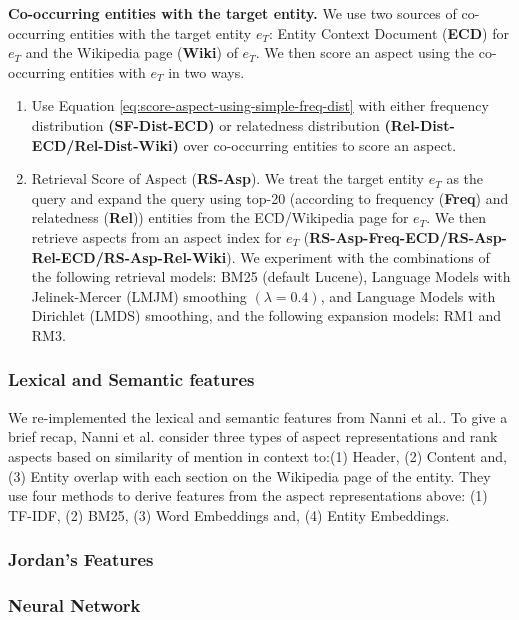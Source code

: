\textbf{Co-occurring entities with the target entity.} 
We use two sources of co-occurring entities with the target entity $e_T$: Entity Context Document (\textbf{ECD}) for $e_T$ and the Wikipedia page (\textbf{Wiki}) of $e_T$. We then score an aspect using the co-occurring entities with $e_T$ in two ways.

    
\begin{enumerate}
    \item Use Equation \ref{eq:score-aspect-using-simple-freq-dist} with either frequency distribution \textbf{(SF-Dist-ECD)} or relatedness distribution \textbf{(Rel-Dist-ECD/Rel-Dist-Wiki)} over co-occurring entities to score an aspect.
        
    \item Retrieval Score of Aspect (\textbf{RS-Asp}). We treat the target entity $e_T$ as the query and expand the query using top-20 (according to frequency (\textbf{Freq}) and relatedness (\textbf{Rel})) entities from the ECD/Wikipedia page for $e_T$. We then retrieve aspects from an aspect index for $e_T$ (\textbf{RS-Asp-Freq-ECD/RS-Asp-Rel-ECD/RS-Asp-Rel-Wiki}). We experiment with the combinations of the following retrieval models: BM25 (default Lucene), Language Models with Jelinek-Mercer (LMJM) smoothing $(\lambda = 0.4)$, and Language Models with Dirichlet (LMDS) smoothing, and the following expansion models: RM1 and RM3.
\end{enumerate}
    

\subsubsection{Lexical and Semantic features}
\label{subsubsec:Lexical and Semantic features} 
We re-implemented the lexical and semantic features from Nanni et
al.\cite{nanni2018entity}. To give a brief recap, Nanni et al.\cite{nanni2018entity} consider three types of aspect representations and rank aspects based on similarity of mention in context to:(1) Header, (2) Content and, (3) Entity overlap with each section on the Wikipedia page of the entity. They use four methods to derive features from the aspect representations above: (1) TF-IDF, (2) BM25, (3) Word Embeddings and, (4) Entity Embeddings.

\subsubsection{Jordan's Features} 

\cite{pytorch}
\subsubsection{Neural Network}



